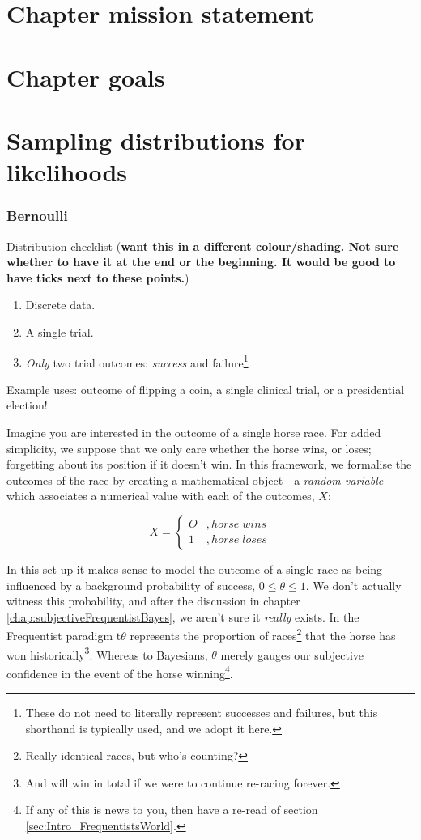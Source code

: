 \documentclass[11pt,fullpage]{book}
\begin{document}
\section{Chapter mission statement}
\section{Chapter goals}

\section{Sampling distributions for likelihoods}
\subsubsection{Bernoulli}\label{sec:Distributions_bernoulli}

Distribution checklist (\textbf{want this in a different colour/shading. Not sure whether to have it at the end or the beginning. It would be good to have ticks next to these points.})

\begin{enumerate}
\item Discrete data.
\item A single trial.
\item \textit{Only} two trial outcomes: \textit{success} and failure\footnote{These do not need to literally represent successes and failures, but this shorthand is typically used, and we adopt it here.}
\end{enumerate}

Example uses: outcome of flipping a coin, a single clinical trial, or a presidential election!

Imagine you are interested in the outcome of a single horse race. For added simplicity, we suppose that we only care whether the horse wins, or loses; forgetting about its position if it doesn't win. In this framework, we formalise the outcomes of the race by creating a mathematical object - a \textit{random variable} - which associates a numerical value with each of the outcomes, $X$:

\begin{equation}
X =
\begin{cases}
O & , horse\; wins \\
1 & , horse\; loses
\end{cases}
\end{equation}

In this set-up it makes sense to model the outcome of a single race as being influenced by a background probability of success, $0\leq\theta\leq 1$. We don't actually witness this probability, and after the discussion in chapter \ref{chap:subjectiveFrequentistBayes}, we aren't sure it \textit{really} exists. In the Frequentist paradigm t$\theta$ represents the proportion of races\footnote{Really identical races, but who's counting?} that the horse has won historically\footnote{And will win in total if we were to continue re-racing forever.}. Whereas to Bayesians, $\theta$ merely gauges our subjective confidence in the event of the horse winning\footnote{If any of this is news to you, then have a re-read of section \ref{sec:Intro_FrequentistsWorld}.}.
\end{document}
